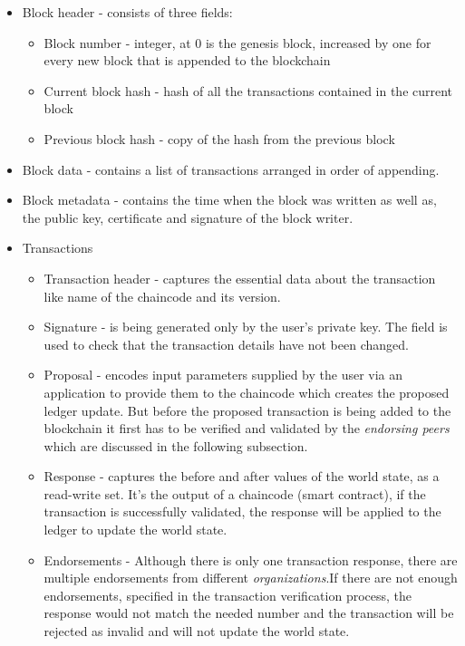 \documentclass[a4paper,11pt]{report}
\begin{document}
\begin{itemize}
\item Block header - consists of three fields:
	\begin{itemize}
	\item Block number - integer, at 0 is the genesis block, increased by one for every new block that is appended to the blockchain
	\item Current block hash - hash of all the transactions contained in the current block
	\item Previous block hash - copy of the hash from the previous block
	\end{itemize}	 
\item Block data - contains a list of transactions arranged in order of appending.
\item Block metadata - contains the time when the block was written as well as, the public key, certificate and signature of the block writer. 
\item Transactions
	\begin{itemize}
	\item Transaction header - captures the essential data about the transaction like name of the chaincode and its version. 
	\item Signature - is being generated only by the user's private key. The field is used to check that the transaction details have not been changed.
	\item Proposal - encodes input parameters supplied by the user via an application to provide them to the chaincode which creates the proposed ledger update. But before the proposed transaction is being added to the blockchain it first has to be verified and validated by the \textit{endorsing peers} which are discussed in the following subsection.
	\item Response - captures the before and after values of the world state, as a read-write set. It's the output of a chaincode (smart contract), if the transaction is successfully validated, the response will be applied to the ledger to update the world state. 
	\item Endorsements - Although there is only one transaction response, there are multiple endorsements from different \textit{organizations}.If there are not enough endorsements, specified in the transaction verification process, the response would not match the needed number and the transaction will be rejected as invalid and will not update the world state.  
	\end{itemize}
\end{itemize}
\end{document}
